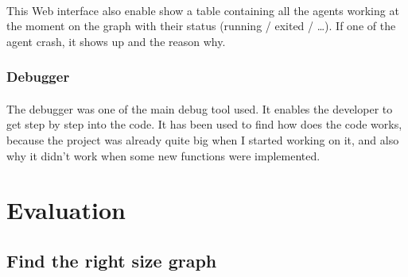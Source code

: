 \documentclass{article}
\begin{document}
			\paragraph{}
				This Web interface also enable show a table containing all the agents working at the moment
				on the graph with their status (running / exited / \dots).
				If one of the agent crash, it shows up and the reason why.
		\subsubsection{Debugger}
			\paragraph{}
				The debugger was one of the main debug tool used.
				It enables the developer to get step by step into the code.
				It has been used to find how does the code works, because the project was already quite big when I started working on it,
				and also why it didn't work when some new functions were implemented.

\section{Evaluation}
	\subsection{Find the right size graph}
\end{document}
